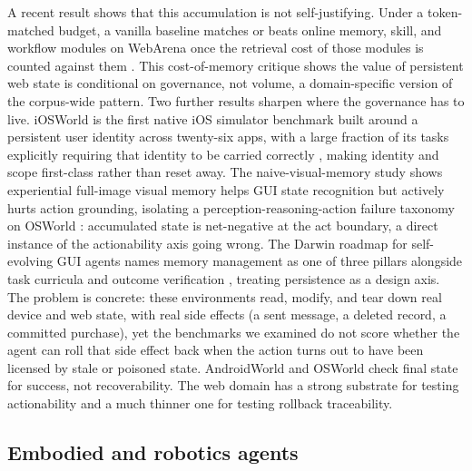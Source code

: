 A recent result shows that this accumulation is not self-justifying. Under a token-matched budget, a vanilla baseline matches or beats online memory, skill, and workflow modules on WebArena once the retrieval cost of those modules is counted against them \citep{hajimiri2026budgetconstrained}. This cost-of-memory critique shows the value of persistent web state is conditional on governance, not volume, a domain-specific version of the corpus-wide pattern. Two further results sharpen where the governance has to live. iOSWorld is the first native iOS simulator benchmark built around a persistent user identity across twenty-six apps, with a large fraction of its tasks explicitly requiring that identity to be carried correctly \citep{jang2026iosworld}, making identity and scope first-class rather than reset away. The naive-visual-memory study shows experiential full-image visual memory helps GUI state recognition but actively hurts action grounding, isolating a perception-reasoning-action failure taxonomy on OSWorld \citep{choi2026naivevisualmemory}: accumulated state is net-negative at the act boundary, a direct instance of the actionability axis going wrong. The Darwin roadmap for self-evolving GUI agents names memory management as one of three pillars alongside task curricula and outcome verification \citep{beechey2026darwin}, treating persistence as a design axis. The problem is concrete: these environments read, modify, and tear down real device and web state, with real side effects (a sent message, a deleted record, a committed purchase), yet the benchmarks we examined do not score whether the agent can roll that side effect back when the action turns out to have been licensed by stale or poisoned state. AndroidWorld and OSWorld check final state for success, not recoverability. The web domain has a strong substrate for testing actionability and a much thinner one for testing rollback traceability.

\subsection{Embodied and robotics agents}

